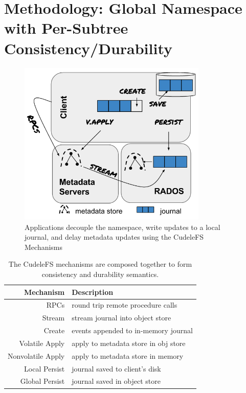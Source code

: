 \section{Methodology: Global Namespace with Per-Subtree Consistency/Durability}
\label{sec:methodology-decoupled-namespaces}

\begin{figure}[tb]
\centering
\includegraphics[width=90mm]{figures/fig-decouple.png}
\caption{Applications decouple the namespace, write updates to a local journal,
and delay metadata updates using the CudeleFS Mechanisms }\label{fig:decouple}
\end{figure}

\begin{table}
\begin{tabular}{ r | l }
  Mechanism         & Description \\\hline
  RPCs              & round trip remote procedure calls \\
  Stream            & stream journal into object store \\
  Create            & events appended to in-memory journal \\
  Volatile Apply    & apply to metadata store in obj store \\
  Nonvolatile Apply & apply to metadata store in memory \\
  Local Persist     & journal saved to client's disk \\
  Global Persist    & journal saved in object store \\
\end{tabular}
\caption{The CudeleFS mechanisms are composed together to form consistency and
durability semantics.\label{table:mechanisms}} 
\end{table}

